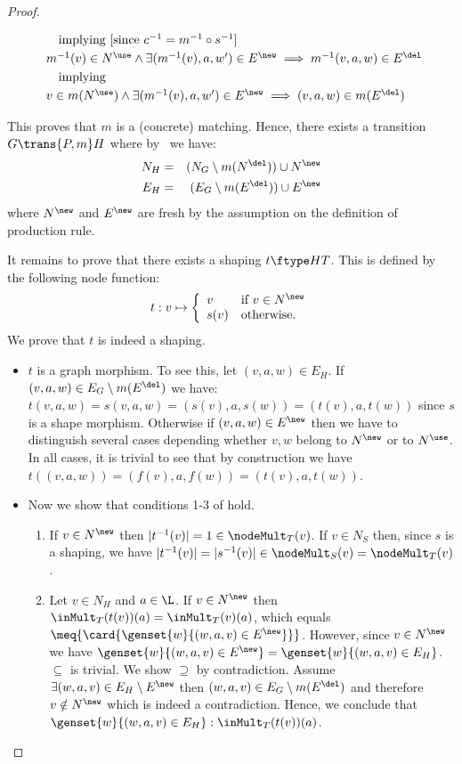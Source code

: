 \begin{proof}
\begin{enumerate}
\[\begin{array}{l@{}}
\quad\mbox{implying [since $c^{-1}=m^{-1} \circ  s^{-1}$]} 
\\[\smallskipamount]
m^{-1}(v) \in N^\use \wedge \exists (m^{-1}(v), a,w') \in E^\new \implies
m^{-1}(v,a,w) \in E^\del  
\\[\smallskipamount]
\quad\mbox{implying}
\\[\smallskipamount]
v \in m(N^\use) \wedge \exists (m^{-1}(v), a,w') \in E^\new \implies
(v,a,w) \in m(E^\del)  
\end{array}\]
\end{enumerate}
This proves that $m$ is a (concrete) matching.  
Hence, there exists a transition
$G\trans{P,m} H$ where by~ we have:
  \begin{eqnarray*}
    N_H & = & (N_G \setminus m(N^\del)) \cup N^{\new} \\
    E_H & = & (E_G \setminus m(E^\del)) \cup E^{\new}
  \end{eqnarray*}
where $N^\new$ and $E^\new$ are fresh by the assumption on the definition of
production rule.

It remains to prove that there exists a shaping $t\ftype H T$.
This is defined by the following node function:
%
\[   t:v  \mapsto  \left \{
     \begin{array}{ll}
        v & \mbox{if $v \in N^\new$}\\
       s(v) & \mbox{otherwise.}
      \end{array}\right.
\]
%
We prove that $t$ is indeed a shaping.
%
\begin{itemize}
\item $t$ is a graph morphism. To see this, let $(v,a,w) \in E_H$.  
If $(v,a,w) \in E_G \setminus m(E^\del)$ we have:
  $t(v,a,w)=s(v,a,w)=(s(v),a,s(w))=(t(v),a,t(w))$ since $s$ is a shape
  morphism.
Otherwise if $(v,a,w) \in E^\new$ then we have to distinguish several cases
depending whether $v,w$ belong to $N^\new$ or to $N^\use$.
In all cases, it is trivial to see that by construction we have
$t((v,a,w))=(f(v),a,f(w))=(t(v),a,t(w))$.
%
\item Now we show that conditions 1-3 of  hold.
\begin{enumerate}
\item If $v \in N^\new$ then $|t^{-1}(v)|=1\in \nodeMult_{T}(v)$.  If $v \in
  N_{S}$ then, since $s$ is a shaping, we have $|t^{-1}(v)|=|s^{-1}(v)|\in
  \nodeMult_{S}(v)=\nodeMult_{T}(v)$.
  
\item Let $v \in N_H$ and $a \in \L$. If $v \in N^\new$ then
  $\inMult_{T}(t(v))(a)= \inMult_{T}(v)(a)$, which equals
  $\meq{\card{\genset{w}{(w,a,v) \in E^\new}}}$.  However, since $v \in N^\new$
  we have $\genset{w}{(w,a,v) \in E^\new}=\genset{w}{(w,a,v) \in E_H}$.
  $\subseteq$ is trivial. We show $\supseteq$ by contradiction.  Assume
  $\exists (w,a,v) \in E_H \setminus E^\new$ then $(w,a,v) \in E_G \setminus
  m(E^\del)$ and therefore $v \notin N^\new$ which is indeed a contradiction.
  Hence, we conclude that $\genset{w}{(w,a,v) \in E_H}:\inMult_{T}(t(v))(a)$.


\end{enumerate}
\end{itemize}
\end{proof}
